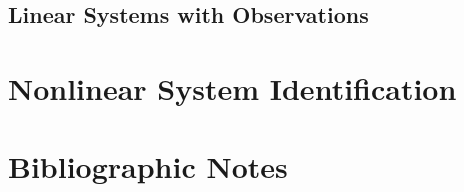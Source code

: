 \subsection{Linear Systems with Observations}

\section{Nonlinear System Identification}


\section{Bibliographic Notes}

